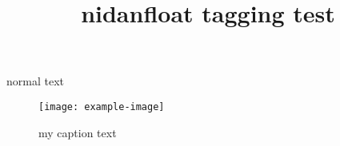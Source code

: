 \documentclass[twocolumn]{article}
\title{nidanfloat tagging test}
\begin{document}
normal text

\begin{figure*}[b]
\centering
\texttt{[image: example-image]}
\caption{my caption text}
\end{figure*}
\end{document}
